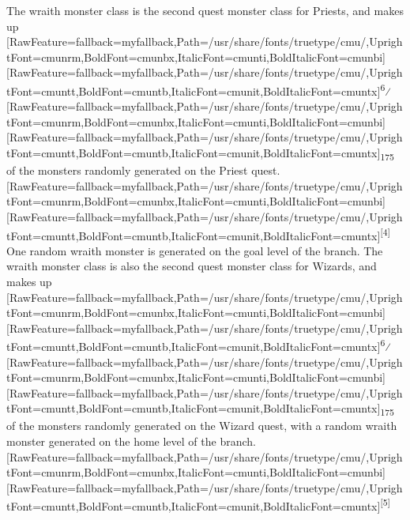 The wraith monster class is the second quest\footnotemark[21] monster class for Priests\footnotemark[22], and makes up \allowbreak{}\setmainfont{cmunrm.ttf}[RawFeature={fallback=myfallback},Path=/usr/share/fonts/truetype/cmu/,UprightFont=cmunrm,BoldFont=cmunbx,ItalicFont=cmunti,BoldItalicFont=cmunbi]\setmonofont{cmunrm.ttf}[RawFeature={fallback=myfallback},Path=/usr/share/fonts/truetype/cmu/,UprightFont=cmuntt,BoldFont=cmuntb,ItalicFont=cmunit,BoldItalicFont=cmuntx]\textsuperscript{6}⁄\allowbreak{}\setmainfont{cmunrm.ttf}[RawFeature={fallback=myfallback},Path=/usr/share/fonts/truetype/cmu/,UprightFont=cmunrm,BoldFont=cmunbx,ItalicFont=cmunti,BoldItalicFont=cmunbi]\setmonofont{cmunrm.ttf}[RawFeature={fallback=myfallback},Path=/usr/share/fonts/truetype/cmu/,UprightFont=cmuntt,BoldFont=cmuntb,ItalicFont=cmunit,BoldItalicFont=cmuntx]\textsubscript{175} of the monsters randomly generated on the Priest quest\footnotemark[23].\allowbreak{}\setmainfont{cmunrm.ttf}[RawFeature={fallback=myfallback},Path=/usr/share/fonts/truetype/cmu/,UprightFont=cmunrm,BoldFont=cmunbx,ItalicFont=cmunti,BoldItalicFont=cmunbi]\setmonofont{cmunrm.ttf}[RawFeature={fallback=myfallback},Path=/usr/share/fonts/truetype/cmu/,UprightFont=cmuntt,BoldFont=cmuntb,ItalicFont=cmunit,BoldItalicFont=cmuntx]\textsuperscript{{$\text{[}$}4{$\text{]}$}} One random wraith monster is generated on the goal level of the branch. The wraith monster class is also the second quest\footnotemark[24] monster class for Wizards\footnotemark[25], and makes up \allowbreak{}\setmainfont{cmunrm.ttf}[RawFeature={fallback=myfallback},Path=/usr/share/fonts/truetype/cmu/,UprightFont=cmunrm,BoldFont=cmunbx,ItalicFont=cmunti,BoldItalicFont=cmunbi]\setmonofont{cmunrm.ttf}[RawFeature={fallback=myfallback},Path=/usr/share/fonts/truetype/cmu/,UprightFont=cmuntt,BoldFont=cmuntb,ItalicFont=cmunit,BoldItalicFont=cmuntx]\textsuperscript{6}⁄\allowbreak{}\setmainfont{cmunrm.ttf}[RawFeature={fallback=myfallback},Path=/usr/share/fonts/truetype/cmu/,UprightFont=cmunrm,BoldFont=cmunbx,ItalicFont=cmunti,BoldItalicFont=cmunbi]\setmonofont{cmunrm.ttf}[RawFeature={fallback=myfallback},Path=/usr/share/fonts/truetype/cmu/,UprightFont=cmuntt,BoldFont=cmuntb,ItalicFont=cmunit,BoldItalicFont=cmuntx]\textsubscript{175} of the monsters randomly generated on the Wizard quest\footnotemark[26], with a random wraith monster generated on the home level of the branch.\allowbreak{}\setmainfont{cmunrm.ttf}[RawFeature={fallback=myfallback},Path=/usr/share/fonts/truetype/cmu/,UprightFont=cmunrm,BoldFont=cmunbx,ItalicFont=cmunti,BoldItalicFont=cmunbi]\setmonofont{cmunrm.ttf}[RawFeature={fallback=myfallback},Path=/usr/share/fonts/truetype/cmu/,UprightFont=cmuntt,BoldFont=cmuntb,ItalicFont=cmunit,BoldItalicFont=cmuntx]\textsuperscript{{$\text{[}$}5{$\text{]}$}} 



